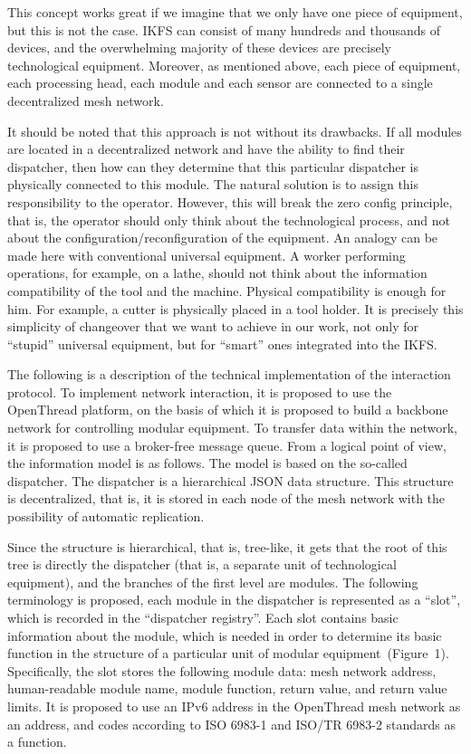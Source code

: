 This concept works great if we imagine that we only have one piece of equipment, but this is not the case. IKFS can consist of many hundreds and thousands of devices, and the overwhelming majority of these devices are precisely technological equipment. Moreover, as mentioned above, each piece of equipment, each processing head, each module and each sensor are connected to a single decentralized mesh network.

It should be noted that this approach is not without its drawbacks. If all modules are located in a decentralized network and have the ability to find their dispatcher, then how can they determine that this particular dispatcher is physically connected to this module. The natural solution is to assign this responsibility to the operator. However, this will break the zero config principle, that is, the operator should only think about the technological process, and not about the configuration/reconfiguration of the equipment. An analogy can be made here with conventional universal equipment. A worker performing operations, for example, on a lathe, should not think about the information compatibility of the tool and the machine. Physical compatibility is enough for him. For example, a cutter is physically placed in a tool holder. It is precisely this simplicity of changeover that we want to achieve in our work, not only for ``stupid'' universal equipment, but for ``smart'' ones integrated into the IKFS.

The following is a description of the technical implementation of the interaction protocol. To implement network interaction, it is proposed to use the OpenThread platform, on the basis of which it is proposed to build a backbone network for controlling modular equipment. To transfer data within the network, it is proposed to use a broker-free message queue. From a logical point of view, the information model is as follows. The model is based on the so-called dispatcher. The dispatcher is a hierarchical JSON data structure. This structure is decentralized, that is, it is stored in each node of the mesh network with the possibility of automatic replication.

Since the structure is hierarchical, that is, tree-like, it gets that the root of this tree is directly the dispatcher (that is, a separate unit of technological equipment), and the branches of the first level are modules. The following terminology is proposed, each module in the dispatcher is represented as a ``slot'', which is recorded in the ``dispatcher registry''. Each slot contains basic information about the module, which is needed in order to determine its basic function in the structure of a particular unit of modular equipment~(Figure~1). Specifically, the slot stores the following module data: mesh network address, human-readable module name, module function, return value, and return value limits. It is proposed to use an IPv6 address in the OpenThread mesh network as an address, and codes according to ISO 6983-1 and ISO/TR 6983-2 standards as a function.

